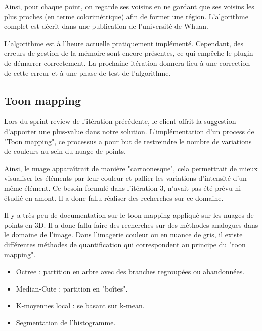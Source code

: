 \documentclass[12pt,titlepage,french]{article}
\begin{document}
Ainsi, pour chaque point, on regarde ses voisins en ne gardant que ses voisins les plus proches (en terme colorimétrique) afin de former une région. L'algorithme complet est décrit dans une publication de l'université de \cite{B03} Whuan. \newline

L'algorithme est à l'heure actuelle pratiquement implémenté. Cependant, des erreurs de gestion de la mémoire sont encore présentes, ce qui empêche le plugin de démarrer correctement. La prochaine itération donnera lieu à une correction de cette erreur et à une phase de test de l'algorithme.

\subsection{Toon mapping}

Lors du sprint review de l'itération précédente, le client offrit la suggestion d'apporter une plus-value dans notre solution.
L'implémentation d'un process de "Toon mapping", ce processus a pour but de restreindre le nombre de variations de couleurs au sein du nuage de points. \newline

Ainsi, le nuage apparaîtrait de manière "cartoonesque", cela permettrait de mieux visualiser les éléments par leur couleur et pallier les variations d'intensité d'un même élément.
Ce besoin formulé dans l'itération 3, n'avait pas été prévu ni étudié en amont. Il a donc fallu réaliser des recherches sur ce domaine. \newline

Il y a très peu de documentation sur le toon mapping appliqué sur les nuages de points en 3D. Il a donc fallu faire des recherches sur des méthodes analogues dans le domaine de l'image. 
Dans l'imagerie couleur ou en nuance de gris, il existe différentes méthodes de quantification qui correspondent au principe du "toon mapping". \newline

\begin{itemize}
    \item Octree : partition en arbre avec des branches regroupées ou abandonnées.
    \item Median-Cute : partition en "boîtes".
    \item K-moyennes local : se basant sur k-mean.
    \item Segmentation de l'histogramme.
\end{itemize}
\end{document}
